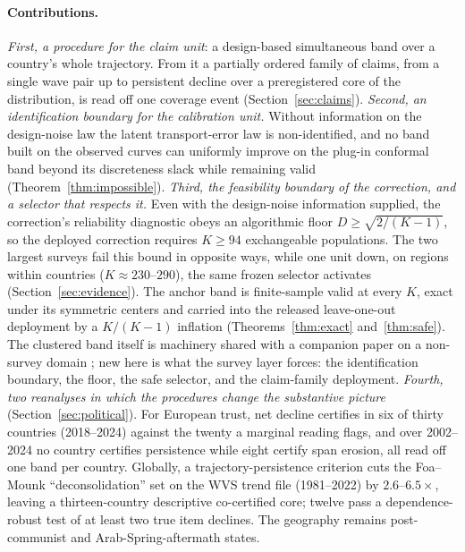 \paragraph{Contributions.}
\emph{First, a procedure for the claim unit}: a design-based simultaneous band
over a country's whole trajectory. From it a partially ordered family of
claims, from a single wave pair up to persistent decline over a
preregistered core of the distribution, is read off one coverage event
(Section~\ref{sec:claims}).
\emph{Second, an identification boundary for the calibration unit.} Without
information on the design-noise law the latent transport-error law is
non-identified, and no band built on the observed curves can uniformly improve
on the plug-in conformal band beyond its discreteness slack while remaining
valid (Theorem~\ref{thm:impossible}).
\emph{Third, the feasibility boundary of the correction, and a selector that
respects it.} Even with the design-noise information supplied, the
correction's reliability diagnostic obeys an algorithmic floor
$D\ge\sqrt{2/(K-1)}$, so the deployed correction requires $K\ge94$
exchangeable populations. The two largest surveys fail this bound in
opposite ways, while one unit down, on regions within countries
($K\approx230$--$290$), the same frozen selector activates
(Section~\ref{sec:evidence}). The anchor band is finite-sample valid at
every $K$, exact under its symmetric centers and carried into the released
leave-one-out deployment by a $K/(K{-}1)$ inflation
(Theorems~\ref{thm:exact} and~\ref{thm:safe}). The clustered band itself is
machinery shared with a companion paper on a non-survey domain
\citep{park2026poverty}; new here is what the survey layer forces: the identification boundary, the floor, the safe selector, and the
claim-family deployment.
\emph{Fourth, two reanalyses in which the procedures change the substantive
picture} (Section~\ref{sec:political}). For European trust, net decline
certifies in six of thirty countries (2018--2024) against the twenty a
marginal reading flags, and over 2002--2024 no country certifies
persistence while eight certify span erosion, all read off one band per
country. Globally, a trajectory-persistence criterion cuts the Foa--Mounk
``deconsolidation'' set on the WVS trend file (1981--2022) by
$2.6$--$6.5\times$, leaving a thirteen-country descriptive co-certified core;
twelve pass a dependence-robust test of at least two true item declines. The geography remains
post-communist and Arab-Spring-aftermath states.
